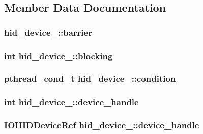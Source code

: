\subsection{Member Data Documentation}
\hypertarget{structhid__device___a17ee95bea7f4171afed271574f0aed3a}{
\subsubsection[{barrier}]{ hid\-\_\-device\-\_\-\-::barrier}}\label{structhid__device___a17ee95bea7f4171afed271574f0aed3a}
\hypertarget{structhid__device___ae4a8b40297f31863df3133637cfa2121}{
\subsubsection[{blocking}]{\setlength{\rightskip}{0pt plus 5cm}int hid\-\_\-device\-\_\-\-::blocking}}\label{structhid__device___ae4a8b40297f31863df3133637cfa2121}
\hypertarget{structhid__device___ac1e660212fdb3880218c7976ac834ad7}{
\subsubsection[{condition}]{\setlength{\rightskip}{0pt plus 5cm}pthread\-\_\-cond\-\_\-t hid\-\_\-device\-\_\-\-::condition}}\label{structhid__device___ac1e660212fdb3880218c7976ac834ad7}
\hypertarget{structhid__device___acbcc48ecdd887f36390da3bb05a6d5d5}{
\subsubsection[{device\-\_\-handle}]{\setlength{\rightskip}{0pt plus 5cm}int hid\-\_\-device\-\_\-\-::device\-\_\-handle}}\label{structhid__device___acbcc48ecdd887f36390da3bb05a6d5d5}
\hypertarget{structhid__device___add41d44d3e24fe6ea144cd849c12fea7}{
\subsubsection[{device\-\_\-handle}]{\setlength{\rightskip}{0pt plus 5cm}I\-O\-H\-I\-D\-Device\-Ref hid\-\_\-device\-\_\-\-::device\-\_\-handle}}\label{structhid__device___add41d44d3e24fe6ea144cd849c12fea7}
